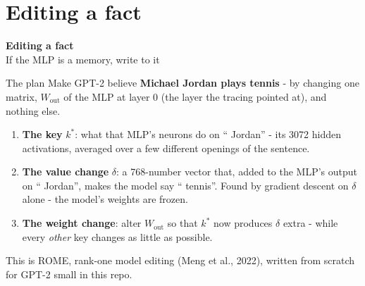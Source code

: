 \documentclass[aspectratio=169]{beamer}
\newcommand{\sectiontransition}[2]{%
  \begin{frame}[plain]
    \vfill
    \begin{center}
      {\Huge\bfseries\color{popblue} #1}\\[1.1em]
      {\large #2}
    \end{center}
    \vfill
  \end{frame}}
\begin{document}
\section{Editing a fact}
\sectiontransition{Editing a fact}{If the MLP is a memory, write to it}

\begin{frame}{The plan}
  \vspace{0.5em}
  Make GPT-2 believe \textbf{Michael Jordan plays tennis} - by changing one matrix, $W_{\text{out}}$
  of the MLP at layer 0 (the layer the tracing pointed at), and nothing else.

  \vspace{0.6em}
  \begin{enumerate}
    \item \textbf{The key} $k^*$: what that MLP's neurons do on `` Jordan'' - its 3072 hidden
      activations, averaged over a few different openings of the sentence.
    \item \textbf{The value change} $\delta$: a 768-number vector that, added to the MLP's output on
      `` Jordan'', makes the model say `` tennis''. Found by gradient descent on $\delta$ alone -
      the model's weights are frozen.
    \item \textbf{The weight change}: alter $W_{\text{out}}$ so that $k^*$ now produces $\delta$
      extra - while every \emph{other} key changes as little as possible.
  \end{enumerate}

  \vspace{0.4em}
  {\footnotesize This is ROME, rank-one model editing (Meng et al., 2022), written from scratch
  for GPT-2 small in this repo.}
\end{frame}
\end{document}
